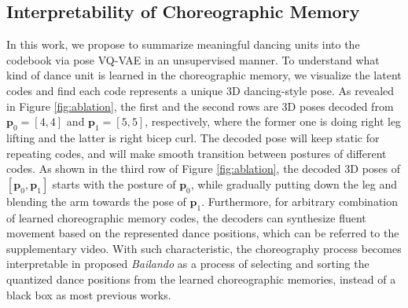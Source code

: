 \vspace{-5pt}
\subsection{Interpretability of Choreographic Memory}
\label{subsec:interpretable}
\vspace{-2pt}
In this work, we propose to  summarize meaningful dancing units into the codebook via pose VQ-VAE in an unsupervised manner.
To understand what kind of dance unit is learned in the choreographic memory, we visualize the latent codes and find each code represents a unique 3D dancing-style pose.
As revealed in Figure \ref{fig:ablation}, the first and the second rows are 3D poses decoded from $\bm p_0 = [4, 4]$ and $\bm p_1 = [5, 5]$, respectively, where the former one is doing right leg lifting and the latter is right bicep curl.
The decoded pose will keep static for repeating codes, and will make smooth transition between postures of different codes.
As shown in the third row of Figure \ref{fig:ablation}, the decoded 3D poses of $[\bm p_0, \bm p_1]$ starts with the posture of $\bm p_0$, while gradually putting down the leg and blending the arm towards the pose of $\bm p_1$.
Furthermore, for arbitrary combination of learned choreographic memory codes, the decoders can synthesize fluent movement based on the represented dance positions, which can be referred to the supplementary video.
With such characteristic, the choreography process becomes interpretable in proposed  {\textit{Bailando}} as a process of selecting and sorting the quantized dance positions from the learned choreographic memories, instead of a black box as most previous works. 
%
